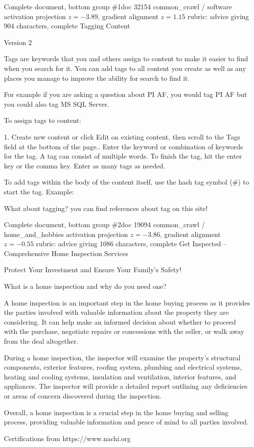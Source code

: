 \begin{docbox}{Complete document, bottom group \#1}{doc 32154 \textbullet{} common\_crawl / software \textbullet{} activation projection $z=-3.89$, gradient alignment $z=1.15$ \textbullet{} rubric: advice giving \textbullet{} 904 characters, complete}
Tagging Content\par Version 2\par     Tags are keywords that you and others assign to content to make it easier to find when you search for it. You can add tags to all content you create as well as any places you manage to improve the ability for search to find it.\par     For example if you are asking a question about PI AF, you would tag PI AF but you could also tag MS SQL Server.~~~~~~\par     To assign tags to content:\par     1. Create new content or click Edit on existing content, then scroll to the Tags field at the bottom of the page.. Enter the keyword or combination of keywords for the tag. A tag can consist of multiple words. To finish the tag, hit the enter key or the comma key. Enter as many tags as needed.\par     To add tags within the body of the content itself, use the hash tag symbol (\#) to start the tag. Example:\par     What about tagging? you can find references about tag on this site!
\end{docbox}

\begin{docbox}{Complete document, bottom group \#2}{doc 19094 \textbullet{} common\_crawl / home\_and\_hobbies \textbullet{} activation projection $z=-3.86$, gradient alignment $z=-0.55$ \textbullet{} rubric: advice giving \textbullet{} 1086 characters, complete}
Get Inspected – Comprehensive Home Inspection Services\par Protect Your Investment and Ensure Your Family’s Safety!\par What is a home inspection and why do you need one?\par A home inspection is an important step in the home buying process as it provides the parties involved with valuable information about the property they are considering. It can help make an informed decision about whether to proceed with the purchase, negotiate repairs or concessions with the seller, or walk away from the deal altogether.\par During a home inspection, the inspector will examine the property’s structural components, exterior features, roofing system, plumbing and electrical systems, heating and cooling systems, insulation and ventilation, interior features, and appliances. The inspector will provide a detailed report outlining any deficiencies or areas of concern discovered during the inspection.\par Overall, a home inspection is a crucial step in the home buying and selling process, providing valuable information and peace of mind to all parties involved.\par Certifications from https://www.nachi.org
\end{docbox}

